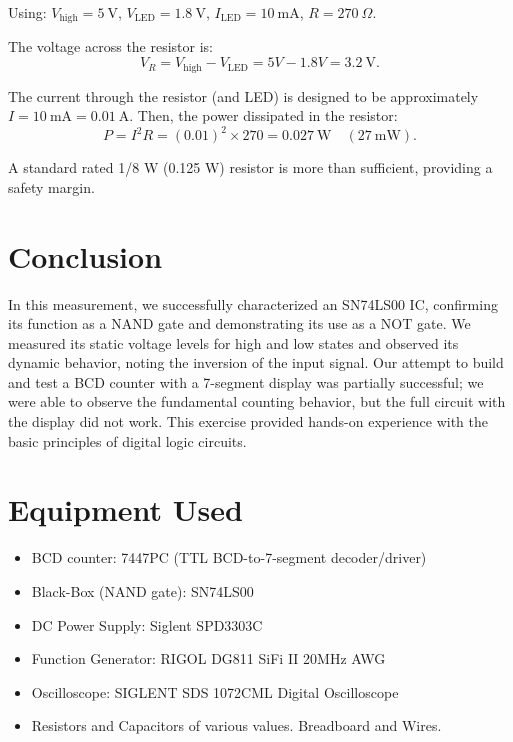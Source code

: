 \documentclass[12pt,a4paper]{article}
\begin{document}
Using: $V_{\text{high}} = 5\ \text{V}$, $V_{\text{LED}} = 1.8\ \text{V}$, $I_{\text{LED}} = 10\ \text{mA}$, $R = 270\ \Omega$.

The voltage across the resistor is:
\[
V_R = V_{\text{high}} - V_{\text{LED}} = 5 V - 1.8 V = 3.2\ \text{V}.
\]

The current through the resistor (and LED) is designed to be approximately $I = 10\ \text{mA} = 0.01\ \text{A}$. Then, the power dissipated in the resistor:
\[
P = I^2 R = (0.01)^2 \times 270 = 0.027\ \text{W} \quad (27\ \text{mW}).
\]

A standard rated 1/8 W (0.125 W) resistor is more than sufficient, providing a safety margin.

\section{Conclusion}
In this measurement, we successfully characterized an SN74LS00 IC, confirming its function as a NAND gate and demonstrating its use as a NOT gate. We measured its static voltage levels for high and low states and observed its dynamic behavior, noting the inversion of the input signal. Our attempt to build and test a BCD counter with a 7-segment display was partially successful; we were able to observe the fundamental counting behavior, but the full circuit with the display did not work. This exercise provided hands-on experience with the basic principles of digital logic circuits.

\section{Equipment Used}
\begin{itemize}
    \item BCD counter: 7447PC (TTL BCD-to-7-segment decoder/driver)
    \item Black-Box (NAND gate): SN74LS00
    \item DC Power Supply: Siglent SPD3303C
    \item Function Generator: RIGOL DG811 SiFi II 20MHz AWG
    \item Oscilloscope: SIGLENT SDS 1072CML Digital Oscilloscope
    \item Resistors and Capacitors of various values. Breadboard and Wires.
\end{itemize}
\end{document}
